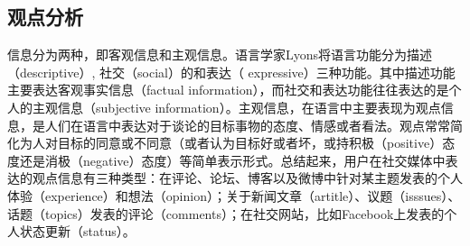 \subsection{观点分析}


信息分为两种，即客观信息和主观信息。语言学家Lyons将语言功能分为描述（descriptive）, 社交（social）的和表达（ expressive）三种功能。其中描述功能主要表达客观事实信息（factual information），而社交和表达功能往往表达的是个人的主观信息（subjective information）。主观信息，在语言中主要表现为观点信息，是人们在语言中表达对于谈论的目标事物的态度、情感或者看法。观点常常简化为人对目标的同意或不同意（或者认为目标好或者坏，或持积极（positive）态度还是消极（negative）态度）等简单表示形式。总结起来，用户在社交媒体中表达的观点信息有三种类型：在评论、论坛、博客以及微博中针对某主题发表的个人体验（experience）和想法（opinion）；关于新闻文章（artitle）、议题（isssues）、话题（topics）发表的评论（comments）；在社交网站，比如Facebook上发表的个人状态更新（status）。

